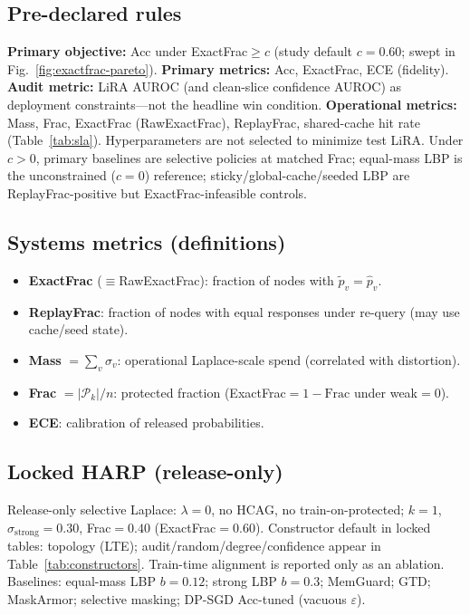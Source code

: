 \documentclass[conference]{IEEEtran}
\begin{document}
\subsection{Pre-declared rules}
\textbf{Primary objective:} Acc under ExactFrac$\ge c$ (study default $c{=}0.60$; swept in Fig.~\ref{fig:exactfrac-pareto}).
\textbf{Primary metrics:} Acc, ExactFrac, ECE (fidelity).
\textbf{Audit metric:} LiRA AUROC (and clean-slice confidence AUROC) as deployment constraints---not the headline win condition.
\textbf{Operational metrics:} Mass, Frac, ExactFrac (RawExactFrac), ReplayFrac, shared-cache hit rate (Table~\ref{tab:sla}).
Hyperparameters are not selected to minimize test LiRA.
Under $c{>}0$, primary baselines are selective policies at matched Frac; equal-mass LBP is the unconstrained ($c{=}0$) reference; sticky/global-cache/seeded LBP are ReplayFrac-positive but ExactFrac-infeasible controls.

\subsection{Systems metrics (definitions)}
\begin{itemize}
  \item \textbf{ExactFrac} ($\equiv$RawExactFrac): fraction of nodes with $\tilde p_v=\hat p_v$.
  \item \textbf{ReplayFrac}: fraction of nodes with equal responses under re-query (may use cache/seed state).
  \item \textbf{Mass} $=\sum_v \sigma_v$: operational Laplace-scale spend (correlated with distortion).
  \item \textbf{Frac} $=|\mathcal{P}_k|/n$: protected fraction (ExactFrac${=}1-\mathrm{Frac}$ under weak${=}0$).
  \item \textbf{ECE}: calibration of released probabilities.
\end{itemize}

\subsection{Locked HARP (release-only)}
Release-only selective Laplace: $\lambda{=}0$, no HCAG, no train-on-protected; $k{=}1$, $\sigma_{\mathrm{strong}}{=}0.30$, Frac${=}0.40$ (ExactFrac${=}0.60$).
Constructor default in locked tables: topology (LTE); audit/random/degree/confidence appear in Table~\ref{tab:constructors}.
Train-time alignment is reported only as an ablation.
Baselines: equal-mass LBP $b{=}0.12$; strong LBP $b{=}0.3$; MemGuard; GTD; MaskArmor; selective masking; DP-SGD Acc-tuned (vacuous $\varepsilon$).
\end{document}
